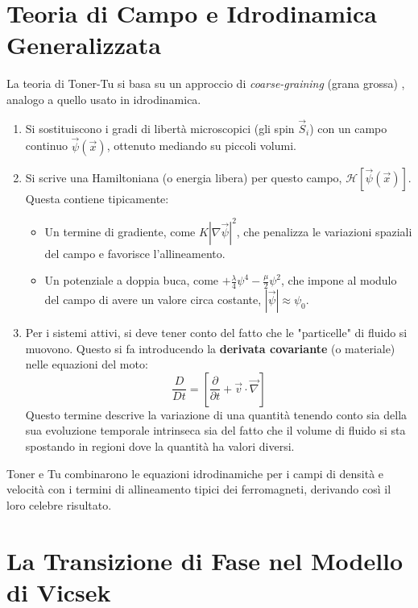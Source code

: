 \section{Teoria di Campo e Idrodinamica Generalizzata}
La teoria di Toner-Tu si basa su un approccio di \textit{coarse-graining} (grana grossa) , analogo a quello usato in idrodinamica.
\begin{enumerate}
    \item Si sostituiscono i gradi di libertà microscopici (gli spin $\vec{S}_i$) con un campo continuo $\vec{\psi}(\vec{x})$, ottenuto mediando su piccoli volumi.
    \item Si scrive una Hamiltoniana (o energia libera) per questo campo, $\mathcal{H}[\vec{\psi}(\vec{x})]$. Questa contiene tipicamente:
    \begin{itemize}
        \item Un termine di gradiente, come $K|\nabla\vec{\psi}|^2$, che penalizza le variazioni spaziali del campo e favorisce l'allineamento.
        \item Un potenziale a doppia buca, come $+\frac{\lambda}{4}\psi^4 - \frac{\mu}{2}\psi^2$, che impone al modulo del campo di avere un valore circa costante, $|\vec{\psi}| \approx \psi_0$.
    \end{itemize}
    \item Per i sistemi attivi, si deve tener conto del fatto che le "particelle" di fluido si muovono. Questo si fa introducendo la \textbf{derivata covariante} (o materiale) nelle equazioni del moto:
    \begin{equation}
        \frac{D}{Dt} = \left[ \frac{\partial}{\partial t} + \vec{v} \cdot \vec{\nabla} \right]
    \end{equation}
    Questo termine descrive la variazione di una quantità tenendo conto sia della sua evoluzione temporale intrinseca sia del fatto che il volume di fluido si sta spostando in regioni dove la quantità ha valori diversi.
\end{enumerate}
Toner e Tu combinarono le equazioni idrodinamiche per i campi di densità e velocità con i termini di allineamento tipici dei ferromagneti, derivando così il loro celebre risultato.

\section{La Transizione di Fase nel Modello di Vicsek}
